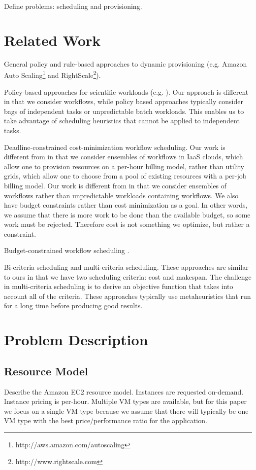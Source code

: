 \documentclass{sig-alternate}
\begin{document}
Define problems: scheduling and provisioning.


\section{Related Work}
General policy and rule-based approaches to dynamic provisioning (e.g. Amazon Auto Scaling\footnote{http://aws.amazon.com/autoscaling} and RightScale\footnote{http://www.rightscale.com}).

Policy-based approaches for scientific workloads (e.g. \cite{Marshall2010, Kim2011}). Our approach is different in that we consider workflows, while policy based approaches typically consider bags of independent tasks or unpredictable batch workloads. This enables us to take advantage of scheduling heuristics that cannot be applied to independent tasks.

Deadline-constrained cost-minimization workflow scheduling. Our work is different from \cite{Yu2005, Abrishami2010} in that we consider ensembles of workflows in IaaS clouds, which allow one to provision resources on a per-hour billing model, rather than utility grids, which allow one to choose from a pool of existing resources with a per-job billing model. Our work is different from \cite{Mao2011} in that we consider ensembles of workflows rather than unpredictable workloads containing workflows. We also have budget constraints rather than cost minimization as a goal. In other words, we assume that there is more work to be done than the available budget, so some work must be rejected. Therefore cost is not something we optimize, but rather a constraint.

Budget-constrained workflow scheduling \cite{Sakellariou2007}.

Bi-criteria scheduling and multi-criteria scheduling. These approaches are similar to ours in that we have two scheduling criteria: cost and makespan. The challenge in multi-criteria scheduling is to derive an objective function that takes into account all of the criteria. These approaches typically use metaheuristics that run for a long time before producing good results.

\section{Problem Description}
\subsection{Resource Model}
Describe the Amazon EC2 resource model. Instances are requested on-demand. Instance pricing is per-hour. Multiple VM types are available, but for this paper we focus on a single VM type because we assume that there will typically be one VM type with the best price/performance ratio for the application.
\end{document}
